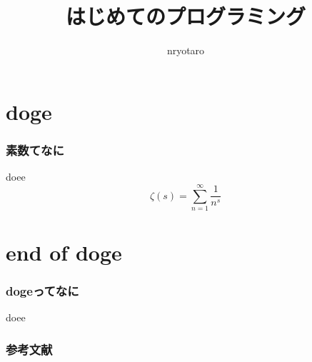 \documentclass[unicode]{beamer}
\title{はじめてのプログラミング}
\author{nryotaro}
\institute{doge}
\begin{document}
\begin{frame}
\titlepage
\end{frame}
\section{doge}
\begin{frame}
\frametitle{素数てなに}
doee\cite{doge0}
\begin{equation}
 \zeta(s) = \sum_{n=1}^\infty \frac{1}{n^s}
\end{equation}
\end{frame}
\section{end of doge}
\begin{frame}[t]
\frametitle{dogeってなに}
doee
\end{frame}
\begin{frame}[allowframebreaks]
  \frametitle{参考文献}
  
  \nocite{*} %


\end{frame}
\end{document}
